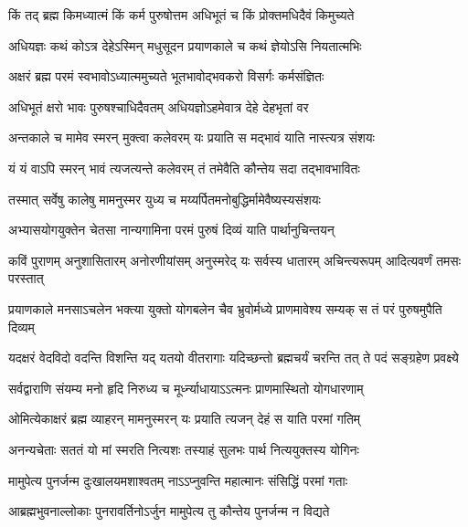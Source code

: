 
\twolineshloka
{किं तद् ब्रह्म किमध्यात्मं किं कर्म पुरुषोत्तम}
{अधिभूतं च किं प्रोक्तमधिदैवं किमुच्यते}%

\twolineshloka
{अधियज्ञः कथं कोऽत्र देहेऽस्मिन् मधुसूदन}
{प्रयाणकाले च कथं ज्ञेयोऽसि नियतात्मभिः}%


\twolineshloka
{अक्षरं ब्रह्म परमं स्वभावोऽध्यात्ममुच्यते}
{भूतभावोद्भवकरो विसर्गः कर्मसंज्ञितः}%

\twolineshloka
{अधिभूतं क्षरो भावः पुरुषश्चाधिदैवतम्}
{अधियज्ञोऽहमेवात्र देहे देहभृतां वर}%

\twolineshloka
{अन्तकाले च मामेव स्मरन् मुक्त्वा कलेवरम्}
{यः प्रयाति स मद्भावं याति नास्त्यत्र संशयः}%

\twolineshloka
{यं यं वाऽपि स्मरन् भावं त्यजत्यन्ते कलेवरम्}
{तं तमेवैति कौन्तेय सदा तद्भावभावितः}%

\twolineshloka
{तस्मात् सर्वेषु कालेषु मामनुस्मर युध्य च}
{मय्यर्पितमनोबुद्धिर्मामेवैष्यस्यसंशयः}%

\twolineshloka
{अभ्यासयोगयुक्तेन चेतसा नान्यगामिना}
{परमं पुरुषं दिव्यं याति पार्थानुचिन्तयन्}%

\fourlineindentedshloka
{कविं पुराणम् अनुशासितारम्}
{अनोरणीयांसम् अनुस्मरेद् यः}
{सर्वस्य धातारम् अचिन्त्यरूपम्}
{आदित्यवर्णं तमसः परस्तात्}%

\fourlineindentedshloka
{प्रयाणकाले मनसाऽचलेन}
{भक्त्या युक्तो योगबलेन चैव}
{भ्रुवोर्मध्ये प्राणमावेश्य सम्यक्}
{स तं परं पुरुषमुपैति दिव्यम्}%

\fourlineindentedshloka
{यदक्षरं वेदविदो वदन्ति}
{विशन्ति यद् यतयो वीतरागाः}
{यदिच्छन्तो ब्रह्मचर्यं चरन्ति}
{तत् ते पदं सङ्ग्रहेण प्रवक्ष्ये}%

\twolineshloka
{सर्वद्वाराणि संयम्य मनो हृदि निरुध्य च}
{मूर्ध्न्याधायाऽऽत्मनः प्राणमास्थितो योगधारणाम्}%

\twolineshloka
{ओमित्येकाक्षरं ब्रह्म व्याहरन् मामनुस्मरन्}
{यः प्रयाति त्यजन् देहं स याति परमां गतिम्}%

\twolineshloka
{अनन्यचेताः सततं यो मां स्मरति नित्यशः}
{तस्याहं सुलभः पार्थ नित्ययुक्तस्य योगिनः}%

\twolineshloka
{मामुपेत्य पुनर्जन्म दुःखालयमशाश्वतम्}
{नाऽऽप्नुवन्ति महात्मानः संसिद्धिं परमां गताः}%

\twolineshloka
{आब्रह्मभुवनाल्लोकाः पुनरावर्तिनोऽर्जुन}
{मामुपेत्य तु कौन्तेय पुनर्जन्म न विद्यते}%

